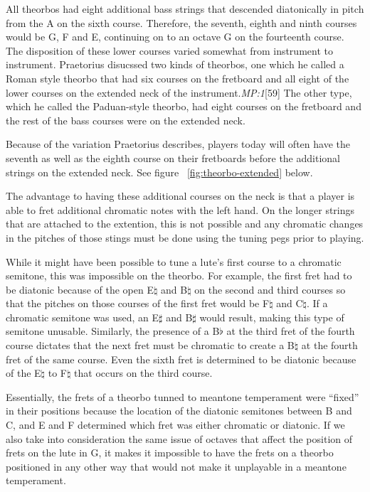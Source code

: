 All theorbos had eight additional bass strings that descended diatonically in pitch from
the A on the sixth course.  Therefore, the seventh, eighth and ninth courses would be G, F
and E, continuing on to an octave G on the fourteenth course.  The disposition of these
lower courses varied somewhat from instrument to instrument.  Praetorius disucssed two
kinds of theorbos, one which he called a Roman style theorbo that had six courses on the
fretboard and all eight of the lower courses on the extended neck of the
instrument.\textit{MP:1}[59] The other type, which he called the Paduan-style
theorbo, had eight courses on the fretboard and the rest of the bass courses were on the
extended neck.

Because of the variation Praetorius describes, players today will often have the seventh
as well as the eighth course on their fretboards before the additional strings on the
extended neck. See figure ~\ref{fig:theorbo-extended} below.

The advantage to having these additional courses on the neck is that a
player is able to fret additional chromatic notes with the left hand.  On the longer
strings that are attached to the extention, this is not possible and any chromatic changes
in the pitches of those stings must be done using the tuning pegs prior to playing.

While it might have been possible to tune a lute's first course to a chromatic semitone,
this was impossible on the theorbo. For example, the first fret had to be diatonic because
of the open E$\natural$ and B$\natural$ on the second and third courses so that the
pitches on those courses of the first fret would be F$\natural$ and C$\natural$.  If a
chromatic semitone was used, an E$\sharp$ and B$\sharp$ would result, making this type of
semitone unusable. Similarly, the presence of a B$\flat$ at the third fret of the fourth
course dictates that the next fret must be chromatic to create a B$\natural$ at the fourth
fret of the same course. Even the sixth fret is determined to be diatonic because of the
E$\natural$ to F$\natural$ that occurs on the third course.

Essentially, the frets of a theorbo tunned to meantone temperament were ``fixed'' in their
positions because the location of the diatonic semitones between B and C, and E and F
determined which fret was either chromatic or diatonic.  If we also take into
consideration the same issue of octaves that affect the position of frets on the lute in
G, it makes it impossible to have the frets on a theorbo positioned in any other way that
would not make it unplayable in a meantone temperament.

